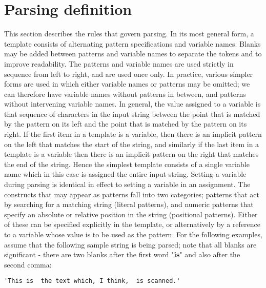 \section{Parsing definition}\label{}
 This section describes the rules that govern parsing.
 In its most general form, a template consists of alternating pattern
specifications and variable names.  Blanks may be added between
patterns and variable names to separate the tokens and to improve
readability.  The patterns and variable names are used strictly in
sequence from left to right, and are used once only.  In practice,
various simpler forms are used in which either variable names or
patterns may be omitted; we can therefore have variable names without
patterns in between, and patterns without intervening variable names.
 In general, the value assigned to a variable is that sequence of
characters in the input string between the point that is matched by the
pattern on its left and the point that is matched by the pattern on its
right.
 If the first item in a template is a variable, then there is an
implicit pattern on the left that matches the start of the string, and
similarly if the last item in a template is a variable then there is an
implicit pattern on the right that matches the end of the string.
Hence the simplest template consists of a single variable name which in
this case is assigned the entire input string.
 Setting a variable during parsing is identical in effect to setting a
variable in an assignment.
 The constructs that may appear as patterns fall into two categories;
patterns that act by searching for a matching string (literal
patterns), and numeric patterns that specify an absolute or relative
position in the string (positional patterns).
Either of these can be specified explicitly in the template, or
alternatively by a reference to a variable whose value is to be used
as the pattern.
 For the following examples, assume that the following sample string
is being parsed; note that all blanks are significant - there are
two blanks after the first word "\textbf{is}" and also after the
second comma:
\begin{lstlisting}
'This is  the text which, I think,  is scanned.'
\end{lstlisting}
